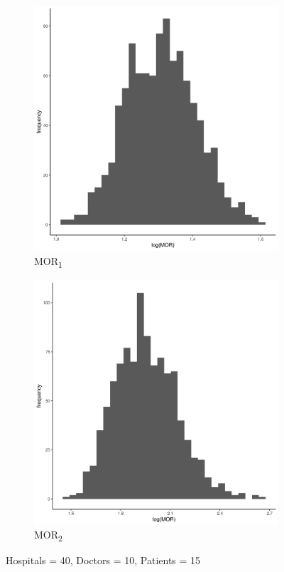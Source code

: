 \documentclass[
  letterpaper,
  DIV=11,
  numbers=noendperiod,
  titlepage]{scrartcl}
\begin{document}
\vspace{10mm}

\begin{figure}
\centering
\begin{subfigure}{.49\textwidth}
    \centering
    \includegraphics[width=.95\linewidth]{../../plots/three-lvl-ran-int/low-prev/hist_40_10_15_three_lvl_low_prev_mor1.png}  
    \caption{MOR\textsubscript{1}}
    \label{l40m10n151}
\end{subfigure}
\begin{subfigure}{.49\textwidth}
    \centering
    \includegraphics[width=.95\linewidth]{../../plots/three-lvl-ran-int/low-prev/hist_40_10_15_three_lvl_low_prev_mor2.png}
    \caption{MOR\textsubscript{2}}
    \label{l40m10n152}
\end{subfigure}
\caption{Hospitals = 40, Doctors = 10, Patients = 15}
\label{mor2}
\end{figure}
\end{document}
